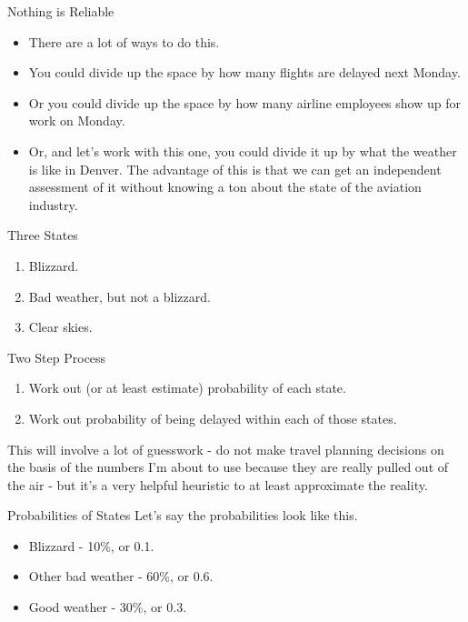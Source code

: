 \documentclass[
  ignorenonframetext,
]{beamer}
\providecommand{\tightlist}{%
  \setlength{\itemsep}{0pt}\setlength{\parskip}{0pt}}
\renewcommand{\,}{\text{, }}
\begin{document}
\begin{frame}{Nothing is Reliable}
\protect\hypertarget{nothing-is-reliable}{}
\begin{itemize}[<+->]
\tightlist
\item
  There are a lot of ways to do this.
\item
  You could divide up the space by how many flights are delayed next
  Monday.
\item
  Or you could divide up the space by how many airline employees show up
  for work on Monday.
\item
  Or, and let's work with this one, you could divide it up by what the
  weather is like in Denver. The advantage of this is that we can get an
  independent assessment of it without knowing a ton about the state of
  the aviation industry.
\end{itemize}
\end{frame}

\begin{frame}{Three States}
\protect\hypertarget{three-states}{}
\begin{enumerate}
\tightlist
\item
  Blizzard.
\item
  Bad weather, but not a blizzard.
\item
  Clear skies.
\end{enumerate}
\end{frame}

\begin{frame}{Two Step Process}
\protect\hypertarget{two-step-process}{}
\begin{enumerate}
\tightlist
\item
  Work out (or at least estimate) probability of each state.
\item
  Work out probability of being delayed within each of those states.
\end{enumerate}

This will involve a lot of guesswork - do not make travel planning
decisions on the basis of the numbers I'm about to use because they are
really pulled out of the air - but it's a very helpful heuristic to at
least approximate the reality.
\end{frame}

\begin{frame}{Probabilities of States}
\protect\hypertarget{probabilities-of-states}{}
Let's say the probabilities look like this.

\begin{itemize}
\tightlist
\item
  Blizzard - 10\%, or 0.1.
\item
  Other bad weather - 60\%, or 0.6.
\item
  Good weather - 30\%, or 0.3.
\end{itemize}
\end{frame}
\end{document}
